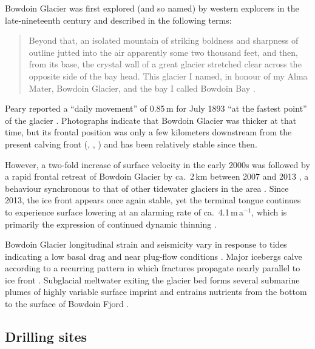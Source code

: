 \documentclass[utf8]{article}
\begin{document}
    Bowdoin Glacier was first explored (and so named) by western explorers in
    the late-nineteenth century and described in the following terms:
    \begin{quote}
        Beyond that, an isolated mountain of striking boldness and sharpness of
        outline jutted into the air apparently some two thousand feet, and
        then, from its base, the crystal wall of a great glacier stretched
        clear across the opposite side of the bay head. This glacier I named,
        in honour of my Alma Mater, Bowdoin Glacier, and the bay I called
        Bowdoin Bay \citep[p.~393--394]{Peary.1898}.
    \end{quote}
    Peary reported a ``daily movement'' of 0.85\,m for July 1893 ``at the
    fastest point'' of the glacier \citep{Chamberlin.1894}.
    Photographs indicate that Bowdoin Glacier was thicker at that time, but its
    frontal position was only a few kilometers downstream from the present
    calving front (\citealp[p.~668]{Chamberlin.1895}, \citealp[Figs.~64
    and~65]{Chamberlin.1897}, \citealp[Fig.~1]{Podolskiy.etal.2016}) and has
    been relatively stable since then.

    However, a two-fold increase of surface velocity in the early 2000s was
    followed by a rapid frontal retreat of Bowdoin Glacier by ca.~2\,km between
    2007 and 2013 \citep[Fig.~2]{Sugiyama.etal.2015}, a behaviour synchronous
    to that of other tidewater glaciers in the area
    \citep{Sakakibara.Sugiyama.2018}. Since 2013, the ice front appears once
    again stable, yet the terminal tongue continues to experience surface
    lowering at an alarming rate of ca.~4.1\,m\,a$^{-1}$, which is primarily
    the expression of continued dynamic thinning \citep{Tsutaki.etal.2016}.

    Bowdoin Glacier longitudinal strain and seismicity vary in response to
    tides~\citep{Podolskiy.etal.2016, Podolskiy.etal.2017} indicating a low
    basal drag and near plug-flow conditions \citep{Seddik.etal.2019}. Major
    icebergs calve according to a recurring pattern in which fractures
    propagate nearly parallel to ice front \citep{Jouvet.etal.2017}. Subglacial
    meltwater exiting the glacier bed forms several submarine plumes of highly
    variable surface imprint \citep{Jouvet.etal.2018} and entrains nutrients
    from the bottom to the surface of Bowdoin Fjord \citep{Kanna.etal.2018}.


\subsection{Drilling sites}
\end{document}
